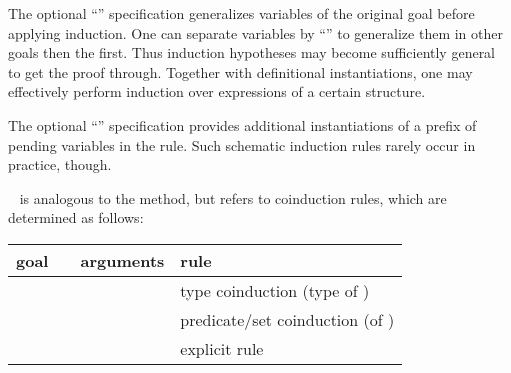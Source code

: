 \begin{isabellebody}
\begin{isamarkuptext}
\begin{description}
  The optional ``''
  specification generalizes variables  of the original goal before applying induction.  One can
  separate variables by ``'' to generalize them in other
  goals then the first. Thus induction hypotheses may become
  sufficiently general to get the proof through.  Together with
  definitional instantiations, one may effectively perform induction
  over expressions of a certain structure.
  
  The optional ``''
  specification provides additional instantiations of a prefix of
  pending variables in the rule.  Such schematic induction rules
  rarely occur in practice, though.

  \item \hyperlink{method.coinduct}{\mbox{}}~ is analogous to the
  \hyperlink{method.induct}{\mbox{}} method, but refers to coinduction rules, which are
  determined as follows:

  \medskip
  \begin{tabular}{llll}
    goal          &                    & arguments & rule \\\hline
                  & \hyperlink{method.coinduct}{\mbox{\isa{coinduct}}} & \isa{x} & type coinduction (type of \isa{x}) \\
    \isa{{\isaliteral{22}{\isachardoublequote}}A\ x{\isaliteral{22}{\isachardoublequote}}} & \hyperlink{method.coinduct}{\mbox{\isa{coinduct}}} & \isa{{\isaliteral{22}{\isachardoublequote}}{\isaliteral{5C3C646F74733E}{\isasymdots}}{\isaliteral{22}{\isachardoublequote}}} & predicate/set coinduction (of \isa{A}) \\
    \isa{{\isaliteral{22}{\isachardoublequote}}{\isaliteral{5C3C646F74733E}{\isasymdots}}{\isaliteral{22}{\isachardoublequote}}}   & \hyperlink{method.coinduct}{\mbox{\isa{coinduct}}} & \isa{{\isaliteral{22}{\isachardoublequote}}{\isaliteral{5C3C646F74733E}{\isasymdots}}\ rule{\isaliteral{3A}{\isacharcolon}}\ R{\isaliteral{22}{\isachardoublequote}}} & explicit rule \isa{R} \\
  \end{tabular}
  

\end{description}
\end{isamarkuptext}
\end{isabellebody}
